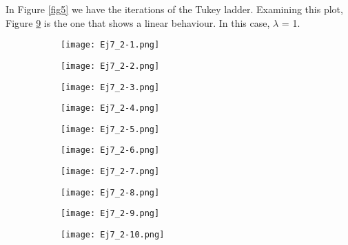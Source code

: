 \documentclass{article}
\begin{document}
In Figure \ref{fig5} we have the iterations of the Tukey ladder. Examining this plot, Figure \ref{sb5-9} is the one that shows a linear behaviour. In this case, $\lambda$ = 1.\\

\begin{figure}[]
\begin{subfigure}{.23\textwidth}
  \centering
  \texttt{[image: Ej7\_2-1.png]}  
  \caption{ }
  \label{sb5-1}
\end{subfigure}
\begin{subfigure}{.23\textwidth}
  \centering
  \texttt{[image: Ej7\_2-2.png]}  
  \caption{ }
  \label{sb5-2}
\end{subfigure}
\begin{subfigure}{.23\textwidth}
  \centering
  \texttt{[image: Ej7\_2-3.png]}  
  \caption{ }
  \label{sb5-3}
\end{subfigure}
\begin{subfigure}{.23\textwidth}
  \centering
  \texttt{[image: Ej7\_2-4.png]}  
  \caption{ }
  \label{sb5-4}
\end{subfigure}
\newline
\begin{subfigure}{.23\textwidth}
  \centering
  \texttt{[image: Ej7\_2-5.png]}  
  \caption{ }
  \label{sb5-5}
\end{subfigure}
\begin{subfigure}{.23\textwidth}
  \centering
  \texttt{[image: Ej7\_2-6.png]}  
  \caption{ }
  \label{sb5-6}
\end{subfigure}
\begin{subfigure}{.23\textwidth}
  \centering
  \texttt{[image: Ej7\_2-7.png]}  
  \caption{ }
  \label{sb5-7}
\end{subfigure}
\begin{subfigure}{.23\textwidth}
  \centering
  \texttt{[image: Ej7\_2-8.png]}  
  \caption{ }
  \label{sb5-8}
\end{subfigure}
\newline
\begin{subfigure}{.23\textwidth}
  \centering
  \texttt{[image: Ej7\_2-9.png]}  
  \caption{ }
  \label{sb5-9}
\end{subfigure}
\begin{subfigure}{.23\textwidth}
  \centering
  \texttt{[image: Ej7\_2-10.png]}  
  \caption{ }

\end{subfigure}
\end{figure}
\end{document}
